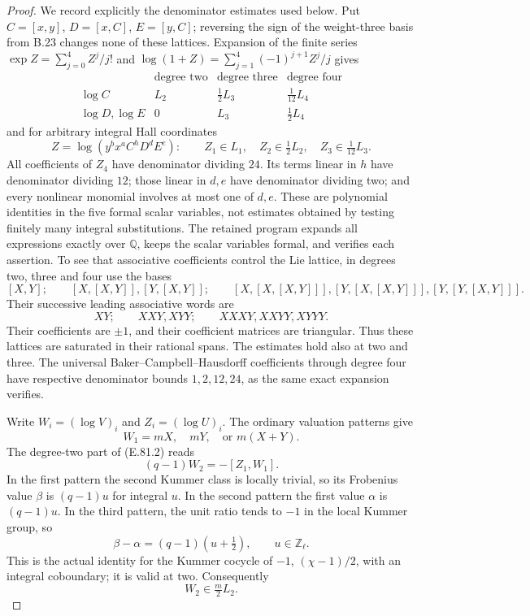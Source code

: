 \begin{proof}
We record explicitly the denominator estimates used below. Put
$C=[x,y]$, $D=[x,C]$, $E=[y,C]$; reversing the sign of the
weight-three basis from B.23 changes none of these lattices.
Expansion of the finite series
$\exp Z=\sum_{j=0}^4Z^j/j!$ and
$\log(1+Z)=\sum_{j=1}^4(-1)^{j+1}Z^j/j$ gives
\[
\begin{array}{c|ccc}
 &\text{degree two}&\text{degree three}&\text{degree four}\\\hline
 \log C&L_2&\frac12L_3&\frac1{12}L_4\\
 \log D,\log E&0&L_3&\frac12L_4
\end{array}
\tag{E.81.3}
\]
and for arbitrary integral Hall coordinates
\[
 Z=\log(y^b x^aC^hD^dE^e):\qquad
       Z_1\in L_1,\quad Z_2\in\tfrac12L_2,
       \quad Z_3\in\tfrac1{12}L_3.
 \tag{E.81.4}
\]
All coefficients of $Z_4$ have denominator dividing $24$.
Its terms linear in $h$ have denominator dividing $12$;
those linear in $d,e$ have denominator dividing two; and every
nonlinear monomial involves at most one of $d,e$.
These are polynomial identities in the five formal scalar
variables, not estimates obtained by testing finitely many
integral substitutions. The retained program
 expands all expressions
exactly over $\mathbb Q$, keeps the scalar variables formal,
and verifies each assertion. To see that associative coefficients
control the Lie lattice, in degrees two, three and four use the
bases
\[
 [X,Y];\qquad [X,[X,Y]],[Y,[X,Y]];\qquad
 [X,[X,[X,Y]]],[Y,[X,[X,Y]]],[Y,[Y,[X,Y]]].
\]
Their successive leading associative words are
\[
 XY;\qquad XXY,XYY;\qquad XXXY,XXYY,XYYY.
\]
Their coefficients are $\pm1$, and their coefficient matrices
are triangular. Thus these lattices are
saturated in their rational spans. The estimates hold also at
two and three. The universal Baker--Campbell--Hausdorff
coefficients through degree four have respective denominator
bounds $1,2,12,24$, as the same exact expansion verifies.

Write $W_i=(\log V)_i$ and $Z_i=(\log U)_i$.
The ordinary valuation patterns give
\[
 W_1=mX,\quad mY,\quad\text{or }m(X+Y).
\]
The degree-two part of (E.81.2) reads
\[
              (q-1)W_2=-[Z_1,W_1].
 \tag{E.81.5}
\]
In the first pattern the second Kummer class is locally trivial,
so its Frobenius value $\beta$ is $(q-1)u$ for integral $u$.
In the second pattern the first value $\alpha$ is $(q-1)u$.
In the third pattern, the unit ratio tends to $-1$ in the local
Kummer group, so
\[
                 \beta-\alpha=(q-1)(u+\tfrac12),
                 \qquad u\in\mathbb Z_\ell.
\]
This is the actual identity for the Kummer cocycle of $-1$,
$(\chi-1)/2$, with an integral coboundary; it is valid at two.
Consequently
\[
                            W_2\in\tfrac m2L_2.
 \tag{E.81.6}
\]


\end{proof}
